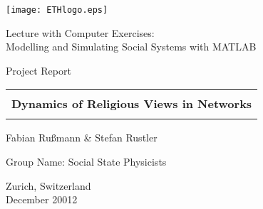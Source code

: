
\thispagestyle{empty}

\begin{center}
\texttt{[image: ETHlogo.eps]}

\bigskip


\bigskip


\bigskip


\LARGE{ 	Lecture with Computer Exercises:\\ }
\LARGE{ Modelling and Simulating Social Systems with MATLAB\\}

\bigskip

\bigskip

\small{Project Report}\\

\bigskip

\bigskip

\bigskip

\bigskip


\begin{tabular}{|c|}
\hline
\\
\textbf{\LARGE{Dynamics of Religious Views in Networks}}\\
\\
\hline
\end{tabular}
\bigskip

\bigskip

\bigskip



\LARGE{Fabian Rußmann \& Stefan Rustler}


Group Name: Social State Physicists

\bigskip

\bigskip

\bigskip

\bigskip

\bigskip

\bigskip

\bigskip

\bigskip

Zurich, Switzerland\\
December 20012\\

\end{center}


